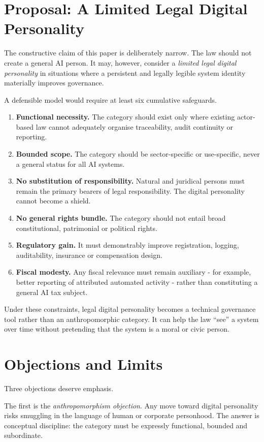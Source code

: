 \documentclass[11pt]{article}
\begin{document}
\section{Proposal: A Limited Legal Digital Personality}
The constructive claim of this paper is deliberately narrow. The law should not create a general AI person. It may, however, consider a \emph{limited legal digital personality} in situations where a persistent and legally legible system identity materially improves governance.

A defensible model would require at least six cumulative safeguards.

\begin{enumerate}[leftmargin=1.4em]
  \item \textbf{Functional necessity.} The category should exist only where existing actor-based law cannot adequately organise traceability, audit continuity or reporting.
  \item \textbf{Bounded scope.} The category should be sector-specific or use-specific, never a general status for all AI systems.
  \item \textbf{No substitution of responsibility.} Natural and juridical persons must remain the primary bearers of legal responsibility. The digital personality cannot become a shield.
  \item \textbf{No general rights bundle.} The category should not entail broad constitutional, patrimonial or political rights.
  \item \textbf{Regulatory gain.} It must demonstrably improve registration, logging, auditability, insurance or compensation design.
  \item \textbf{Fiscal modesty.} Any fiscal relevance must remain auxiliary - for example, better reporting of attributed automated activity - rather than constituting a general AI tax subject.
\end{enumerate}

Under these constraints, legal digital personality becomes a technical governance tool rather than an anthropomorphic category. It can help the law ``see'' a system over time without pretending that the system is a moral or civic person.

\section{Objections and Limits}
Three objections deserve emphasis.

The first is the \emph{anthropomorphism objection}. Any move toward digital personality risks smuggling in the language of human or corporate personhood. The answer is conceptual discipline: the category must be expressly functional, bounded and subordinate.
\end{document}
